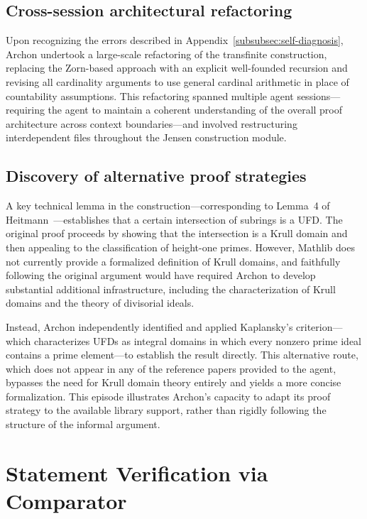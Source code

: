 \documentclass[]{pkuai4m}
\theoremstyle{plain}
\theoremstyle{definition}
\begin{document}
\subsection{Cross-session architectural refactoring}\label{subsubsec:refactoring}

Upon recognizing the errors described in Appendix~\ref{subsubsec:self-diagnosis}, Archon undertook a large-scale refactoring of the transfinite construction, replacing the Zorn-based approach with an explicit well-founded recursion and revising all cardinality arguments to use general cardinal arithmetic in place of countability assumptions. This refactoring spanned multiple agent sessions---requiring the agent to maintain a coherent understanding of the overall proof architecture across context boundaries---and involved restructuring interdependent files throughout the Jensen construction module.

\subsection{Discovery of alternative proof strategies}\label{subsubsec:alternative-strategy}

A key technical lemma in the construction---corresponding to Lemma~4 of Heitmann~\cite{heitmann1993characterization}---establishes that a certain intersection of subrings is a UFD. The original proof proceeds by showing that the intersection is a Krull domain and then appealing to the classification of height-one primes. However, Mathlib does not currently provide a formalized definition of Krull domains, and faithfully following the original argument would have required Archon to develop substantial additional infrastructure, including the characterization of Krull domains and the theory of divisorial ideals.

Instead, Archon independently identified and applied Kaplansky's criterion---which characterizes UFDs as integral domains in which every nonzero prime ideal contains a prime element---to establish the result directly. This alternative route, which does not appear in any of the reference papers provided to the agent, bypasses the need for Krull domain theory entirely and yields a more concise formalization. This episode illustrates Archon's capacity to adapt its proof strategy to the available library support, rather than rigidly following the structure of the informal argument.


\section{Statement Verification via Comparator}\label{appendix:szm_comparator}
\end{document}
